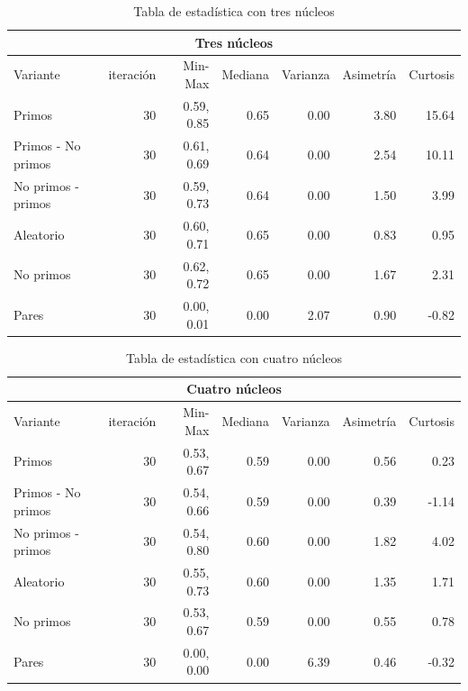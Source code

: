\documentclass{article}
\begin{document}
\begin{table}[H]
\begin{center}
\begin{tabular}{|l | r | r | r | r | r | r|}
\hline
\multicolumn{7}{|c|}{Tres núcleos}\\
\hline
Variante&iteración&Min-Max&Mediana&Varianza&Asimetría&Curtosis\\
\hline
 Primos               & 30 & 0.59, 0.85  & 0.65 & 0.00 & 3.80   & 15.64\\
 Primos - No primos   & 30 & 0.61, 0.69  & 0.64 & 0.00 & 2.54   & 10.11\\
 No primos - primos   & 30 & 0.59, 0.73  & 0.64 & 0.00  & 1.50  & 3.99\\
 Aleatorio            & 30 & 0.60, 0.71  & 0.65 & 0.00 & 0.83   & 0.95\\
 No primos            & 30 & 0.62, 0.72  & 0.65 & 0.00 & 1.67   & 2.31\\
 Pares                & 30 & 0.00, 0.01  & 0.00 & 2.07  & 0.90  & -0.82\\
\hline
\end{tabular}
\caption{Tabla de estadística con tres núcleos}
\label{table:1}
\end{center}
\end{table}

\begin{table}[H]
\begin{center}
\begin{tabular}{|l | r | r | r | r | r | r|}
\hline
\multicolumn{7}{|c|}{Cuatro núcleos}\\
\hline
Variante&iteración&Min-Max&Mediana&Varianza&Asimetría&Curtosis\\
\hline
 Primos               & 30 & 0.53, 0.67  & 0.59 & 0.00 & 0.56   & 0.23\\
 Primos - No primos   & 30 & 0.54, 0.66  & 0.59 & 0.00 & 0.39   & -1.14\\
 No primos - primos   & 30 & 0.54, 0.80  & 0.60 & 0.00  & 1.82  & 4.02\\
 Aleatorio            & 30 & 0.55, 0.73  & 0.60 & 0.00 & 1.35   & 1.71\\
 No primos            & 30 & 0.53, 0.67  & 0.59 & 0.00 & 0.55   & 0.78\\
 Pares                & 30 & 0.00, 0.00  & 0.00 & 6.39 & 0.46  & -0.32\\
\hline
\end{tabular}
\caption{Tabla de estadística con cuatro núcleos}
\label{table:1}
\end{center}
\end{table}
\end{document}
